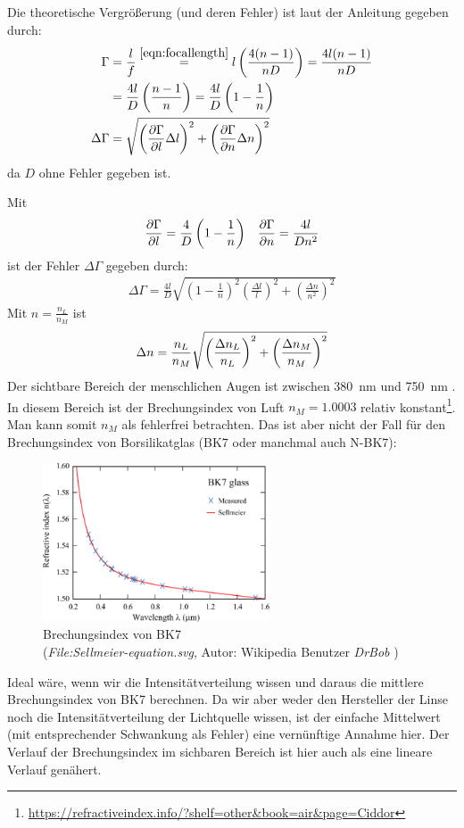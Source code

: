 		Die theoretische Vergrößerung (und deren Fehler) ist laut der Anleitung gegeben durch:
		\begin{align}
			\Gamma &= \frac{l}{f} \overset{\eqref{eqn:focallength}}{=} l \left(\frac{4(n-1)}{nD}\right) = \frac{4l(n-1)}{nD} \notag \\
			&= \frac{4l}{D}\left(\frac{n-1}{n}\right) = \frac{4l}{D}\left(1-\frac{1}{n}\right) \\
			\Delta\Gamma &= \gausserror{\Gamma}{l,n}
		\end{align}
		da $D$ ohne Fehler gegeben ist. 

		Mit
		\begin{align}
			\pdv{\Gamma}{l} = \frac{4}{D}\left(1-\frac{1}{n}\right) && \pdv{\Gamma}{n} = \frac{4l}{Dn^2}
		\end{align}
		ist der Fehler $\Delta\Gamma$ gegeben durch:
		\begin{align}
			\Delta\Gamma = \frac{4l}{D}\sqrt{\left(1-\frac{1}{n}\right)^2\left(\frac{\Delta l}{l}\right)^2 + \left(\frac{\Delta n}{n^2}\right)^2}
			\label{eqn:delta-gamma}
		\end{align}
		Mit $n = \frac{n_L}{n_M}$ ist 
		\begin{align}
			\Delta n = \frac{n_L}{n_M}\relquad{n_L, n_M}
			\label{eqn:delta-n}
		\end{align}
		Der sichtbare Bereich der menschlichen Augen ist zwischen \SI{380}{\nano\meter} und \SI{750}{\nano\meter} \citep{starr_biology_2006}. In diesem Bereich ist der Brechungsindex von Luft $n_M = \num{1.0003}$ relativ konstant\footnote{\url{https://refractiveindex.info/?shelf=other&book=air&page=Ciddor}}. Man kann somit $n_M$ als fehlerfrei betrachten. Das ist aber nicht der Fall für den Brechungsindex von Borsilikatglas (BK7 oder manchmal auch N-BK7):
		\begin{figure}[H]
			\centering
			\includegraphics[width=0.6\textwidth]{plots/bk7.eps}
			\caption{\centering Brechungsindex von BK7 \\ (\textit{File:Sellmeier-equation.svg}, Autor: Wikipedia Benutzer \textit{DrBob} \ccbysa)}
		\end{figure}
		Ideal wäre, wenn wir die Intensitätverteilung wissen und daraus die mittlere Brechungsindex von BK7 berechnen. Da wir aber weder den Hersteller der Linse noch die Intensitätverteilung der Lichtquelle wissen, ist der einfache Mittelwert (mit entsprechender Schwankung als Fehler) eine vernünftige Annahme hier. Der Verlauf der Brechungsindex im sichbaren Bereich ist hier auch als eine lineare Verlauf genähert. 

